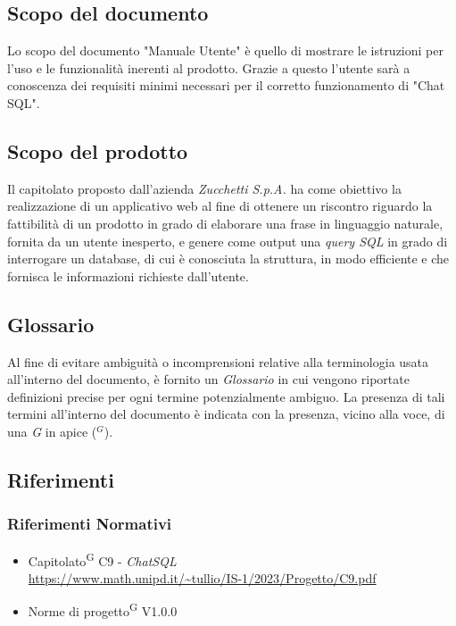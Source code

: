 \documentclass[5pt]{article}
\begin{document}
	\subsection{Scopo del documento}
		Lo scopo del documento "Manuale Utente" è quello di mostrare le istruzioni per l'uso e le funzionalità inerenti al prodotto. Grazie a questo l'utente sarà a conoscenza dei requisiti minimi necessari per il corretto funzionamento di "Chat SQL".
 
	\subsection{Scopo del prodotto}
     	Il capitolato proposto dall'azienda \textit{Zucchetti S.p.A.} ha come obiettivo la realizzazione di un applicativo web al fine di ottenere un riscontro riguardo la fattibilità di un prodotto in grado di elaborare una frase in linguaggio naturale, fornita da un utente inesperto, e genere come output una \textit{query SQL} in grado di interrogare un database, di cui è conosciuta la struttura, in modo efficiente e che fornisca le informazioni richieste dall'utente.

        \subsection{Glossario}
     		Al fine di evitare ambiguità o incomprensioni relative alla terminologia usata all'interno del documento, è fornito un \textit{Glossario} in cui vengono riportate definizioni precise per ogni termine potenzialmente ambiguo. La presenza di tali termini all'interno del documento è indicata con la presenza, vicino alla voce, di una \textit{G} in apice ($^G$). 

        \subsection{Riferimenti}
        
        \subsubsection{Riferimenti Normativi}
        \begin{itemize}
			\item Capitolato\textsuperscript{G} C9 - \textit{ChatSQL} \\ \url{https://www.math.unipd.it/~tullio/IS-1/2023/Progetto/C9.pdf} 
			\item Norme di progetto\textsuperscript{G} V1.0.0
        \end{itemize}
        
\end{document}
